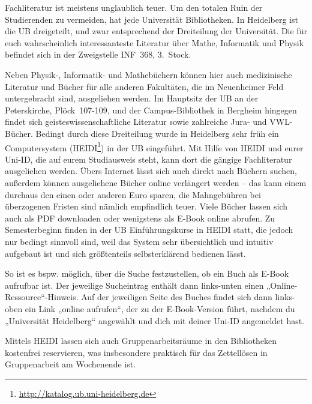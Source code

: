 Fachliteratur ist meistens unglaublich teuer. Um den totalen Ruin der Studierenden zu vermeiden, hat jede Universität Bibliotheken. In Heidelberg ist die \gls{UB} dreigeteilt, und zwar entsprechend der Dreiteilung der Universität. Die für euch wahrscheinlich interessanteste Literatur über Mathe, Informatik und Physik befindet sich in der Zweigstelle \gls{INF}~368, 3.~Stock.


Neben Physik-, Informatik- und Mathebüchern können hier auch medizinische Literatur und Bücher für alle anderen Fakultäten, die im Neuenheimer Feld untergebracht sind, ausgeliehen werden. Im Hauptsitz der \gls{UB} an der Peterskirche, Plöck~107-109, und der Campus-Bibliothek in Bergheim hingegen findet sich geisteswissenschaftliche Literatur sowie zahlreiche Jura- und VWL- Bücher. Bedingt durch diese Dreiteilung wurde in Heidelberg sehr früh ein Computersystem (\gls{HEIDI}\footnote{\url{http://katalog.ub.uni-heidelberg.de}}) in der UB eingeführt. Mit Hilfe von HEIDI und eurer Uni-ID, die auf eurem Studiausweis steht, kann dort die gängige Fachliteratur ausgeliehen werden. Übers Internet lässt sich auch direkt nach Büchern suchen, außerdem können ausgeliehene Bücher online verlängert werden -- das kann einem durchaus den einen oder anderen Euro sparen, die Mahngebühren bei überzogenen Fristen sind nämlich empfindlich teuer. Viele Bücher lassen sich auch als PDF downloaden oder wenigstens als E-Book online abrufen. Zu Semesterbeginn finden in der UB Einführungskurse in HEIDI statt, die jedoch nur bedingt sinnvoll sind, weil das System sehr übersichtlich und intuitiv aufgebaut ist und sich größtenteils selbsterklärend bedienen lässt.

So ist es bspw. möglich, über die Suche festzustellen, ob ein Buch als E-Book aufrufbar ist. Der jeweilige Sucheintrag enthält dann links-unten einen „Online-Ressource“-Hinweis. Auf der jeweiligen Seite des Buches findet sich dann links-oben ein Link „online aufrufen“, der zu der E-Book-Version führt, nachdem du „Universität Heidelberg“ angewählt und dich mit deiner Uni-ID angemeldet hast.

Mittels HEIDI lassen sich auch Gruppenarbeitsräume in den Bibliotheken kostenfrei reservieren, was insbesondere praktisch für das Zettellösen in Gruppenarbeit am Wochenende ist.


